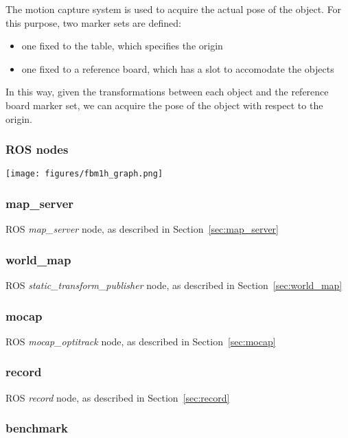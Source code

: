 \documentclass[a4paper]{article}
\begin{document}
The motion capture system is used to acquire the actual pose of the object.
For this purpose, two marker sets are defined:

\begin{itemize}
  \item one fixed to the table, which specifies the origin
  \item one fixed to a reference board, which has a slot to accomodate the objects
\end{itemize}

In this way, given the transformations between each object and the reference board marker set, we can acquire the pose of the object with respect to the origin.

\subsubsection{ROS nodes}

\texttt{[image: figures/fbm1h\_graph.png]}

\subsubsection{map\_server}

ROS \emph{map\_server} node, as described in Section~\ref{sec:map_server}

\subsubsection{world\_map}

ROS \emph{static\_transform\_publisher} node, as described in Section~\ref{sec:world_map}
 
\subsubsection{mocap}

ROS \emph{mocap\_optitrack} node, as described in Section~\ref{sec:mocap}

\subsubsection{record}

ROS \emph{record} node, as described in Section~\ref{sec:record}

\subsubsection{benchmark}
\end{document}
